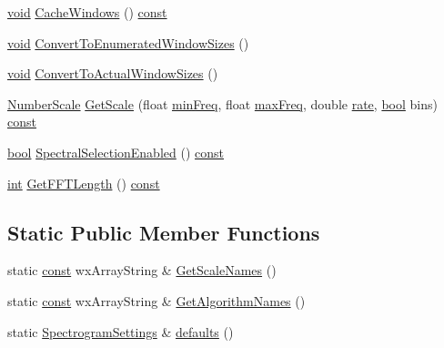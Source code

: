 \begin{DoxyCompactItemize}
\item 
\hyperlink{sound_8c_ae35f5844602719cf66324f4de2a658b3}{void} \hyperlink{class_spectrogram_settings_adbb224098ebcffa29f6963d413ddc3d6}{Cache\+Windows} () \hyperlink{getopt1_8c_a2c212835823e3c54a8ab6d95c652660e}{const} 
\item 
\hyperlink{sound_8c_ae35f5844602719cf66324f4de2a658b3}{void} \hyperlink{class_spectrogram_settings_ad640578ae9ac0284d004893a695a1f7e}{Convert\+To\+Enumerated\+Window\+Sizes} ()
\item 
\hyperlink{sound_8c_ae35f5844602719cf66324f4de2a658b3}{void} \hyperlink{class_spectrogram_settings_a51bf1e9220be4c297250910596471e66}{Convert\+To\+Actual\+Window\+Sizes} ()
\item 
\hyperlink{class_number_scale}{Number\+Scale} \hyperlink{class_spectrogram_settings_aa0c8fbbe53db1ede59a834438a3ee375}{Get\+Scale} (float \hyperlink{class_spectrogram_settings_a2cdeae9342848e7407bf7bb9f5701d2d}{min\+Freq}, float \hyperlink{class_spectrogram_settings_a96c10597fd33d67b76c1ba5389b496e3}{max\+Freq}, double \hyperlink{seqread_8c_ad89d3fac2deab7a9cf6cfc8d15341b85}{rate}, \hyperlink{mac_2config_2i386_2lib-src_2libsoxr_2soxr-config_8h_abb452686968e48b67397da5f97445f5b}{bool} bins) \hyperlink{getopt1_8c_a2c212835823e3c54a8ab6d95c652660e}{const} 
\item 
\hyperlink{mac_2config_2i386_2lib-src_2libsoxr_2soxr-config_8h_abb452686968e48b67397da5f97445f5b}{bool} \hyperlink{class_spectrogram_settings_a3da0925d9ef43e50e04df908923ae48b}{Spectral\+Selection\+Enabled} () \hyperlink{getopt1_8c_a2c212835823e3c54a8ab6d95c652660e}{const} 
\item 
\hyperlink{xmltok_8h_a5a0d4a5641ce434f1d23533f2b2e6653}{int} \hyperlink{class_spectrogram_settings_a35321029bb4e809eedb8721db80c448e}{Get\+F\+F\+T\+Length} () \hyperlink{getopt1_8c_a2c212835823e3c54a8ab6d95c652660e}{const} 
\end{DoxyCompactItemize}
\subsection*{Static Public Member Functions}
\begin{DoxyCompactItemize}
\item 
static \hyperlink{getopt1_8c_a2c212835823e3c54a8ab6d95c652660e}{const} wx\+Array\+String \& \hyperlink{class_spectrogram_settings_a7d6121037a1502d5eb402e0ce6f6d1ef}{Get\+Scale\+Names} ()
\item 
static \hyperlink{getopt1_8c_a2c212835823e3c54a8ab6d95c652660e}{const} wx\+Array\+String \& \hyperlink{class_spectrogram_settings_a52f8118651a63522ce62ade907af3a11}{Get\+Algorithm\+Names} ()
\item 
static \hyperlink{class_spectrogram_settings}{Spectrogram\+Settings} \& \hyperlink{class_spectrogram_settings_a0c2bcef4a3bcdbe8874848a3a0d07f70}{defaults} ()
\end{DoxyCompactItemize}
